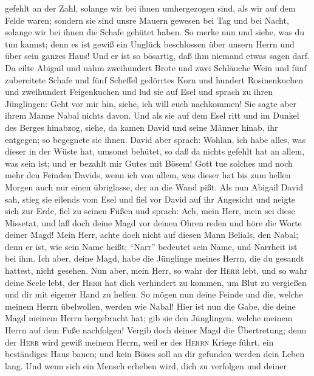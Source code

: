 gefehlt an der Zahl, solange wir bei ihnen umhergezogen sind, als wir
auf dem Felde waren;  sondern sie sind unsre Mauern
gewesen bei Tag und bei Nacht, solange wir bei ihnen die Schafe gehütet
haben.  So merke nun und siehe, was du tun kannst; denn
es ist gewiß ein Unglück beschlossen über unsern Herrn und über sein
ganzes Haus! Und er ist so bösartig, daß ihm niemand etwas sagen darf.
 Da eilte Abigail und nahm zweihundert Brote und zwei
Schläuche Wein und fünf zubereitete Schafe und fünf Scheffel gedörrtes
Korn und hundert Rosinenkuchen und zweihundert Feigenkuchen und lud sie
auf Esel  und sprach zu ihren Jünglingen: Geht vor mir
hin, siehe, ich will euch nachkommen! Sie sagte aber ihrem Manne Nabal
nichts davon.  Und als sie auf dem Esel ritt und im
Dunkel des Berges hinabzog, siehe, da kamen David und seine Männer
hinab, ihr entgegen; so begegnete sie ihnen.  David aber
sprach: Wohlan, ich habe alles, was dieser in der Wüste hat, umsonst
behütet, so daß da nichts gefehlt hat an allem, was sein ist; und er
bezahlt mir Gutes mit Bösem!  Gott tue solches und noch
mehr den Feinden Davids, wenn ich von allem, was dieser hat bis zum
hellen Morgen auch nur einen übriglasse, der an die Wand pißt.
 Als nun Abigail David sah, stieg sie eilends vom Esel
und fiel vor David auf ihr Angesicht und neigte sich zur Erde,
 fiel zu seinen Füßen und sprach: Ach, mein Herr, mein
sei diese Missetat, und laß doch deine Magd vor deinen Ohren reden und
höre die Worte deiner Magd!  Mein Herr, achte doch nicht
auf diesen Mann Belials, den Nabal; denn er ist, wie sein Name heißt;
``Narr'' bedeutet sein Name, und Narrheit ist bei ihm. Ich aber, deine
Magd, habe die Jünglinge meines Herrn, die du gesandt hattest, nicht
gesehen.  Nun aber, mein Herr, so wahr der \textsc{Herr}
lebt, und so wahr deine Seele lebt, der \textsc{Herr} hat dich
verhindert zu kommen, um Blut zu vergießen und dir mit eigener Hand zu
helfen. So mögen nun deine Feinde und die, welche meinem Herrn
übelwollen, werden wie Nabal!  Hier ist nun die Gabe, die
deine Magd meinem Herrn hergebracht hat; gib sie den Jünglingen, welche
meinem Herrn auf dem Fuße nachfolgen!  Vergib doch deiner
Magd die Übertretung; denn der \textsc{Herr} wird gewiß meinem Herrn,
weil er des \textsc{Herrn} Kriege führt, ein beständiges Haus bauen; und
kein Böses soll an dir gefunden werden dein Leben lang. 
Und wenn sich ein Mensch erheben wird, dich zu verfolgen und deiner
